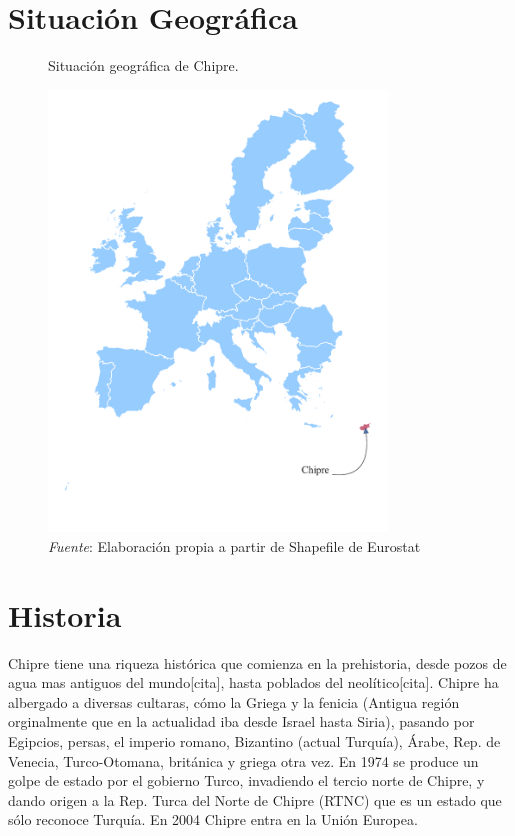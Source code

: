\documentclass[a4paper,openright,12pt]{book}
\begin{document}
\section{Situación Geográfica}


\begin{figure}[htb]
    \centering
    \caption{Situación geográfica de Chipre.}
    \includegraphics[width=9cm]{mapa}
    \caption*{\textit{Fuente}: Elaboración propia a partir de Shapefile de Eurostat}
    \label{fig1}
\end{figure}

\section{Historia}

Chipre tiene una riqueza histórica que comienza en la prehistoria, desde pozos de agua mas antiguos del mundo[cita], hasta poblados del neolítico[cita]. Chipre ha albergado a diversas cultaras, cómo la Griega y la fenicia (Antigua región orginalmente que en la actualidad iba desde Israel hasta Siria), pasando por Egipcios, persas, el imperio romano, Bizantino (actual Turquía), Árabe, Rep. de Venecia, Turco-Otomana, británica y griega otra vez. En 1974 se produce un golpe de estado por el gobierno Turco, invadiendo el tercio norte de Chipre, y dando origen a la Rep. Turca del Norte de Chipre (RTNC) que es un estado que sólo reconoce Turquía. En 2004 Chipre entra en la Unión Europea.
\end{document}
